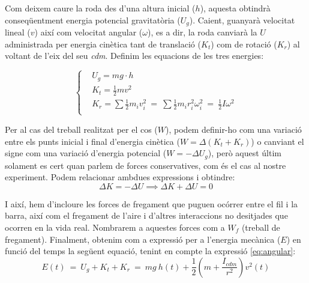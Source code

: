 \documentclass[11pt]{article}
\begin{document}
        \vspace{0.3cm}Com deixem caure la roda des d'una altura inicial ($h$), aquesta obtindrà conseqüentment energia potencial gravitatòria ($U_g$). Caient, guanyarà velocitat lineal ($v$) així com velocitat angular ($\omega$), es a dir, la roda canviarà la $U$ administrada per energia cinètica tant de translació ($K_t$) com de rotació ($K_r$) al voltant de l'eix del seu \textit{cdm}. Definim les equacions de les tres energies:

        \vspace{-0.15cm}
        \begin{equation}
            \begin{cases}
                & U_g = mg\cdot h\\
                & K_t = \frac12 mv^2\\
                & K_r = \sum\frac12 m_i v^2_i\ =\ \sum\frac12 m_i r^2_i \omega^2_i\ =\ \frac12 I\omega^2\\
            \end{cases}
        \end{equation}

        Per al cas del treball realitzat per el cos ($W$), podem definir-ho com una variació entre els punts inicial i final d'energia cinètica ($W=\Delta\left(K_t+K_r\right)$) o canviant el signe com una variació d'energia potencial ($W=-\Delta U_g$), però aquest últim solament es cert quan parlem de forces conservatives, com és el cas al nostre experiment. Podem relacionar ambdues expressions i obtindre:
        \vspace{-0.15cm}
        \begin{equation}
            \Delta K=-\Delta U\implies\Delta K + \Delta U = 0 
            \label{eq:potencial}
        \end{equation}

        \vspace{-0.2cm}I així, hem d'incloure les forces de fregament que puguen ocórrer entre el fil i la barra, així com el fregament de l'aire i d'altres interaccions no desitjades que ocorren en la vida real. Nombrarem a aquestes forces com a $W_f$ (treball de fregament). Finalment, obtenim com a expressió per a l'energia mecànica ($E$) en funció del temps la següent equació, tenint en compte la expressió \ref{eq:angular}:
        \vspace{-0.1cm}
        \begin{equation}
            E (t)\ =\ U_g + K_t + K_r\ =\ mg\ h(t) + \frac12\left(m+\frac{I_{\textit{cdm}}}{r^2}\right)v^2(t)
        \end{equation}
\end{document}

